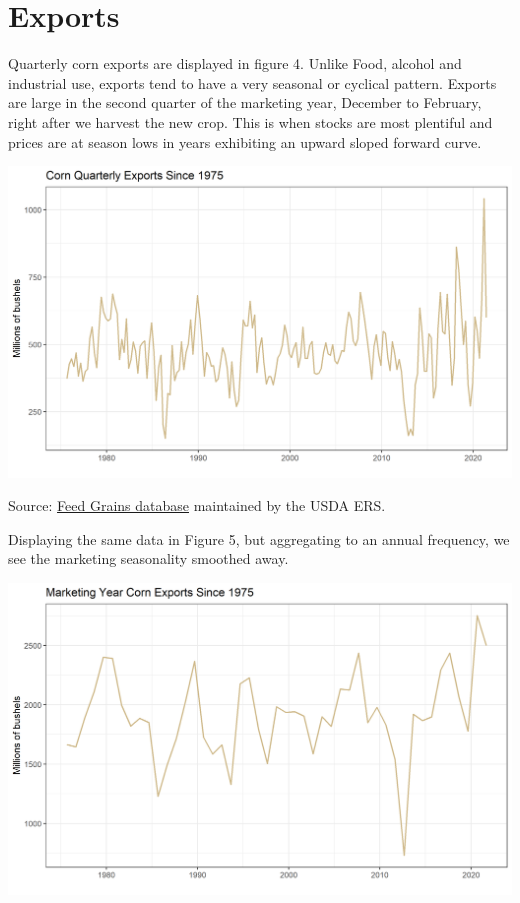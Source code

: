 \documentclass[
]{book}
\begin{document}
\hypertarget{exports}{%
\section{Exports}\label{exports}}

Quarterly corn exports are displayed in figure 4. Unlike Food, alcohol
and industrial use, exports tend to have a very seasonal or cyclical
pattern. Exports are large in the second quarter of the marketing year,
December to February, right after we harvest the new crop. This is when
stocks are most plentiful and prices are at season lows in years
exhibiting an upward sloped forward curve.

\includegraphics{assets/ForecastingUseof-CornUseCategoriesExports.png}

Source: \href{http://www.ers.usda.gov/data-products/feed-grains-database/feed-grains-yearbook-tables.aspx\#26780}{Feed Grains
database}
maintained by the USDA ERS.

Displaying the same data in Figure 5, but aggregating to an annual
frequency, we see the marketing seasonality smoothed away.

\includegraphics{assets/ForecastingUseof-ExportsMY.png}
\end{document}
